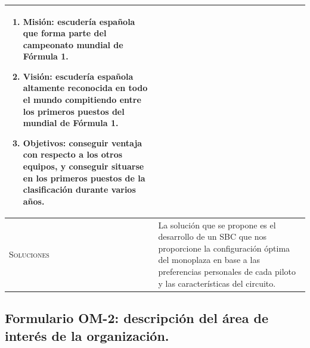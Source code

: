 \documentclass[12pt,a4paper,twoside,spanish]{article}      %
\begin{document}
\begin{table}[H]
\begin{tabularx}{\textwidth}{|l|X|}
\begin{enumerate}
        \item Misión: escudería española que forma parte del campeonato mundial de Fórmula 1.
        \item Visión: escudería española altamente reconocida en todo el mundo compitiendo entre los primeros puestos del mundial de Fórmula 1.
        \item Objetivos: conseguir ventaja con respecto a los otros equipos, y conseguir situarse en los primeros puestos de la clasificación durante varios años. 
\end{enumerate}\\ \hline
\textsc{Soluciones} & La solución que se propone es el desarrollo de un SBC que 
 nos proporcione la configuración óptima del monoplaza en base a las preferencias personales de cada piloto y las características del circuito. \\
\hline
\end{tabularx}
  \label{tab.OM1}
\end{table}




\pagebreak
\subsection{Formulario OM-2: descripción del área de interés de la organización.}
\end{document}
